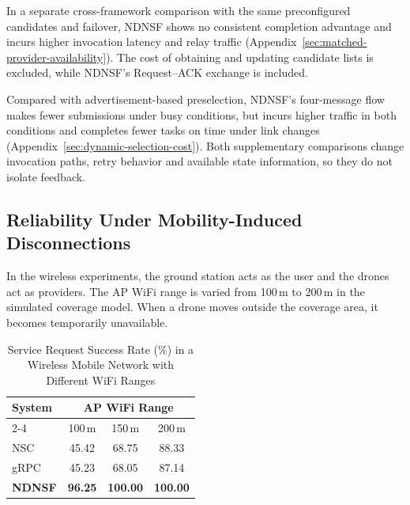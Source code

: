 In a separate cross-framework comparison with the same preconfigured candidates and failover, NDNSF shows no consistent completion advantage and incurs higher invocation latency and relay traffic (Appendix~\ref{sec:matched-provider-availability}). The cost of obtaining and updating candidate lists is excluded, while NDNSF's Request--ACK exchange is included.

Compared with advertisement-based preselection, NDNSF's four-message flow makes fewer submissions under busy conditions, but incurs higher traffic in both conditions and completes fewer tasks on time under link changes (Appendix~\ref{sec:dynamic-selection-cost}). Both supplementary comparisons change invocation paths, retry behavior and available state information, so they do not isolate feedback.

\subsection{Reliability Under Mobility-Induced Disconnections}
\label{sec:mobility-induced-disconnections}

In the wireless experiments, the ground station acts as the user and the drones act as providers. The AP WiFi range is varied from 100\,m to 200\,m in the simulated coverage model. When a drone moves outside the coverage area, it becomes temporarily unavailable.

\begin{table}[!ht]
  \centering
  \caption{
    Service Request Success Rate (\%) in a Wireless Mobile Network with Different WiFi Ranges
  }
  \label{tab:success_rate_wifi_mobile}

  \small
  \setlength{\tabcolsep}{9pt}

  \begin{tabular}{lccc}
    \toprule

    \multirow{2}{*}{System}
      & \multicolumn{3}{c}{AP WiFi Range} \\

    \cmidrule(lr){2-4}

      & 100\,m
      & 150\,m
      & 200\,m \\

    \midrule

    NSC
      & 45.42
      & 68.75
      & 88.33 \\

    gRPC
      & 45.23
      & 68.05
      & 87.14 \\

    \textbf{NDNSF}
      & \textbf{96.25}
      & \textbf{100.00}
      & \textbf{100.00} \\

    \bottomrule
  \end{tabular}
\end{table}

